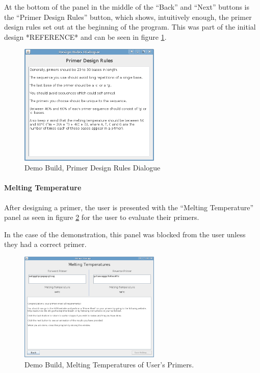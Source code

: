 At the bottom of the panel in the middle of the ``Back'' and ``Next''
buttons is the ``Primer Design Rules'' button, which shows,
intuitively enough, the primer design rules set out at the beginning of the
program.
This was part of the initial design *REFERENCE* and can be seen in
figure \ref{fig:demoBuild:primerDesignRules}.

\begin{figure}[h]
  \begin{center}
    \includegraphics[width=0.6\textwidth]{./images/demoBuild/primerDesignRules.png}
    \caption{
      \label{fig:demoBuild:primerDesignRules}
      Demo Build, Primer Design Rules Dialogue
    }
  \end{center}
\end{figure}

\paragraph{Melting Temperature}

After designing a primer, the user is presented with the ``Melting
Temperature'' panel as seen in figure \ref{fig:demoBuild:meltingTemp}
for the user to evaluate their primers.

In the case of the demonstration, this panel was blocked from the user
unless they had a correct primer.

\begin{figure}[h]
  \begin{center}
    \includegraphics[width=0.6\textwidth]{./images/demoBuild/meltingTemp.png}
    \caption{
      \label{fig:demoBuild:meltingTemp}
      Demo Build, Melting Temperatures of User's Primers.
    }
  \end{center}
\end{figure}

